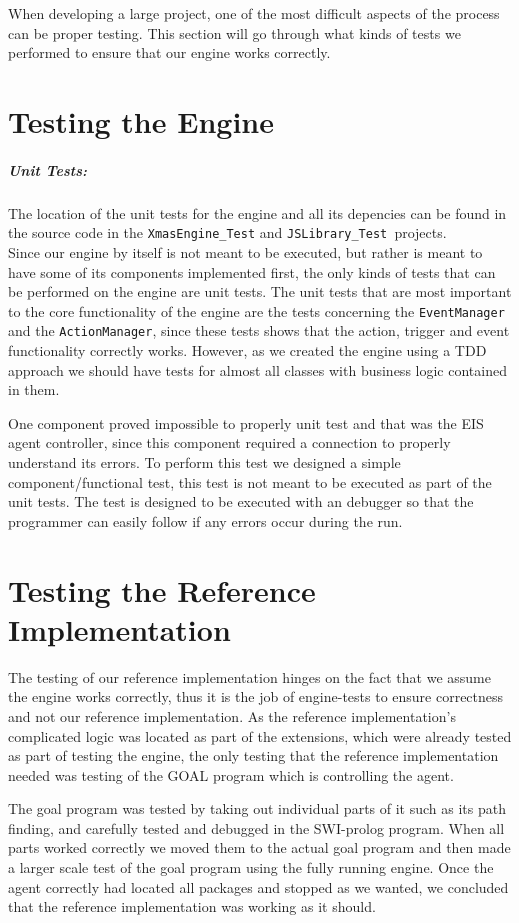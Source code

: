 When developing a large project, one of the most difficult aspects
of the process can be proper testing. This section will go through
what kinds of tests we performed to ensure that our engine works correctly.


\section{Testing the Engine}


\subparagraph*{Unit Tests: }

The location of the unit tests for the engine and all its depencies
can be found in the source code in the \texttt{XmasEngine\_Test} and
\texttt{JSLibrary\_Test }projects.\\


Since our engine by itself is not meant to be executed, but rather
is meant to have some of its components implemented first, the only
kinds of tests that can be performed on the engine are unit tests.
The unit tests that are most important to the core functionality of
the engine are the tests concerning the \texttt{EventManager }and
the \texttt{ActionManager}, since these tests shows that the action,
trigger and event functionality correctly works. However, as we created
the engine using a TDD approach we should have tests for almost all
classes with business logic contained in them. 

One component proved impossible to properly unit test and that was
the EIS agent controller, since this component required a connection
to properly understand its errors. To perform this test we designed
a simple component/functional test, this test is not meant to be executed
as part of the unit tests. The test is designed to be executed with
an debugger so that the programmer can easily follow if any errors
occur during the run.


\section{Testing the Reference Implementation}

The testing of our reference implementation hinges on the fact that
we assume the engine works correctly, thus it is the job of engine-tests
to ensure correctness and not our reference implementation. As the
reference implementation's complicated logic was located as part of
the extensions, which were already tested as part of testing the engine,
the only testing that the reference implementation needed was testing
of the GOAL program which is controlling the agent.

The goal program was tested by taking out individual parts of it such
as its path finding, and carefully tested and debugged in the SWI-prolog
program. When all parts worked correctly we moved them to the actual
goal program and then made a larger scale test of the goal program
using the fully running engine. Once the agent correctly had located
all packages and stopped as we wanted, we concluded that the reference
implementation was working as it should.
